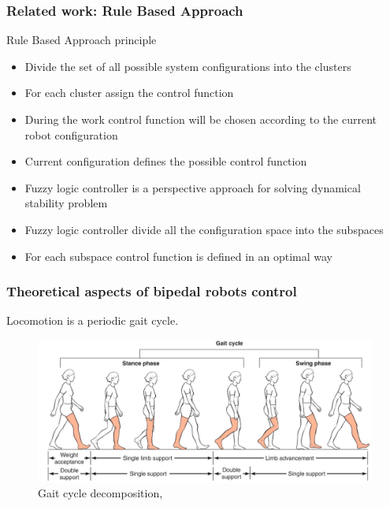 \documentclass{beamer}
\begin{document}

	\begin{frame}
		\frametitle{Related work: Rule Based Approach}
		\begin{block}{Rule Based Approach principle}
			\begin{itemize}
				\item
					Divide the set of all possible system configurations into the clusters
				\item 
					For each cluster assign the control function
				\item During the work control function will be chosen according to the current robot configuration
				\item
					Current configuration defines the possible control function
				\item Fuzzy logic controller is a perspective approach for solving dynamical stability problem
				\item Fuzzy logic controller divide all the configuration space into the subspaces
				\item For each subspace control function is defined in an optimal way
			\end{itemize}
		\end{block}
	\end{frame}


	\begin{frame}
		\frametitle{Theoretical aspects of bipedal robots control}
		\centering
		Locomotion is a periodic gait cycle.
		
		\begin{figure}[h!]
			\begin{minipage}[H]{\linewidth}
				\includegraphics[width=\linewidth]{presentation_images/26}
				\caption{Gait cycle decomposition, \cite{gait}}
			\end{minipage}
		\end{figure}
	\end{frame}
	
\end{document}
